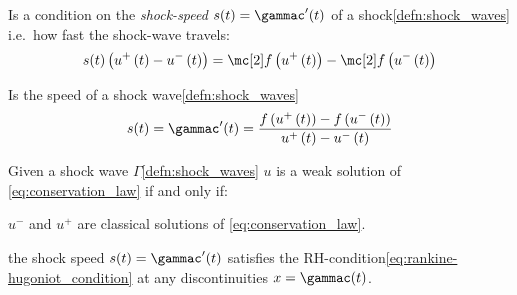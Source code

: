 \begin{defnbox}\nospacing
    \begin{defn}\label{defn:rankine-hugoniot_condition}
        Is a condition on the \textit{shock-speed} $s(t)=\gammac'(t)$ of a shock\cref{defn:shock_waves} i.e.\ how fast the shock-wave travels:
        \begin{align}
          s(t)\left(u^{+}\left(t\right)-u^{-}\left(t\right)\right)=\flux\left(u^{+}\left(t\right)\right)-\flux\left(u^{-}\left(t\right)\right) \label{eq:rankine-hugoniot_condition}
        \end{align}
    \end{defn}
\end{defnbox}
\begin{corbox}\nospacing
    \begin{cor}\label{cor:shock_speed}
        Is the speed of a shock wave\cref{defn:shock_waves}
        \begin{align}
          s(t)=\gammac'(t)=
          \frac{f\left(u^{+}\left(t\right)\right)-f\left(u^{-}\left(t\right)\right)}{u^{+}\left(t\right)-u^{-}\left(t\right)}
        \end{align}
    \end{cor}
\end{corbox}
\begin{theorembox}\nospacing
    \begin{theorem}\label{theorem:weak_solution}
        Given a shock wave $\Gamma$\cref{defn:shock_waves} $u$ is a weak solution of \cref{eq:conservation_law} if and only if:
        \begin{circlelistnosep}
            \item $u^{-}$ and $u^{+}$ are classical solutions of \cref{eq:conservation_law}.
            \item the shock speed $s(t)=\gammac'(t)$ satisfies the RH-condition\cref{eq:rankine-hugoniot_condition} at
            any discontinuities $x=\gammac(t)$.
        \end{circlelistnosep}
    \end{theorem}
\end{theorembox}
